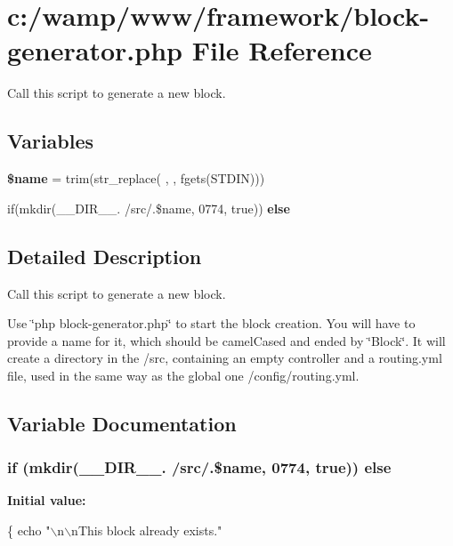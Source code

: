 \hypertarget{block-generator_8php}{}\section{c\+:/wamp/www/framework/block-\/generator.php File Reference}
\label{block-generator_8php}


Call this script to generate a new block.  


\subsection*{Variables}
\begin{DoxyCompactItemize}
\item 
{\bfseries \$name} = trim(str\+\_\+replace(\textquotesingle{} \textquotesingle{}, \textquotesingle{}\textquotesingle{}, fgets(S\+T\+D\+IN)))\hypertarget{block-generator_8php_ab2fc40d43824ea3e1ce5d86dee0d763b}{}\label{block-generator_8php_ab2fc40d43824ea3e1ce5d86dee0d763b}

\item 
if(mkdir(\+\_\+\+\_\+\+D\+I\+R\+\_\+\+\_\+. \textquotesingle{}/src/\textquotesingle{}.\$name, 0774, true)) {\bfseries else}
\end{DoxyCompactItemize}


\subsection{Detailed Description}
Call this script to generate a new block. 

Use \char`\"{}php block-\/generator.\+php\char`\"{} to start the block creation. You will have to provide a name for it, which should be camel\+Cased and ended by \char`\"{}\+Block\char`\"{}. It will create a directory in the /src, containing an empty controller and a routing.\+yml file, used in the same way as the global one /config/routing.yml. 

\subsection{Variable Documentation}
\subsubsection[{\texorpdfstring{else}{else}}]{\setlength{\rightskip}{0pt plus 5cm}if (mkdir(\+\_\+\+\_\+\+D\+I\+R\+\_\+\+\_\+. \textquotesingle{}/src/\textquotesingle{}.\$name, 0774, true)) else}\hypertarget{block-generator_8php_a7328c1fe04d3275b552985d51b4aa3cd}{}\label{block-generator_8php_a7328c1fe04d3275b552985d51b4aa3cd}
{\bfseries Initial value\+:}
\begin{DoxyCode}
\{
    echo \textcolor{stringliteral}{"\(\backslash\)n\(\backslash\)nThis block already exists."}
\end{DoxyCode}
